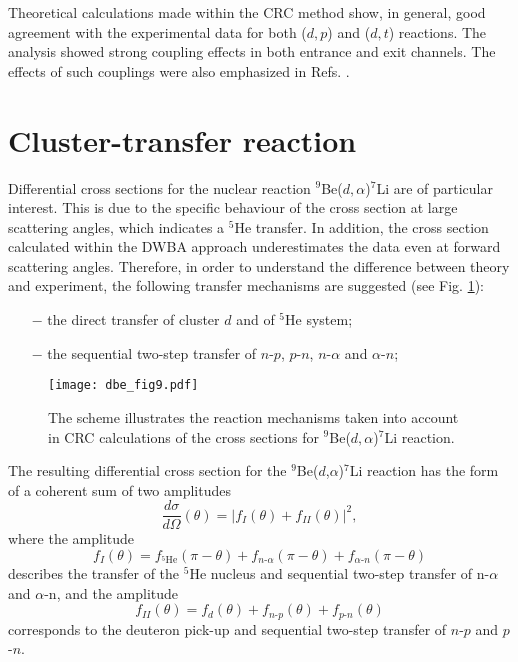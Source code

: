 \documentclass[
12pt, %
oneside, %
english, %
doublespacing, %
doublespacing, %
toctotoc, %
parskip, %
headsepline, %
]{MastersDoctoralThesis} %
\begin{document}
Theoretical calculations made within the CRC method show, in general, good agreement with the experimental data for both ($d,p$)  and ($d,t$) reactions.
The analysis showed strong coupling effects in both entrance and exit channels. The effects of such couplings were also emphasized in Refs. \cite{harakeh1980strong, rudchik2016}.

\section{Cluster-transfer reaction}
Differential cross sections for the nuclear reaction ${^9}$Be($d,\alpha$)${}^7$Li are of particular interest. This is due to the specific behaviour of the cross section at large scattering angles, which indicates a ${}^5$He  transfer. In addition, the cross section calculated within the DWBA approach underestimates the data even at forward scattering angles. Therefore, in order to understand the difference between theory and experiment, the following transfer mechanisms are suggested (see Fig. \ref{dbe_fig9}):
\begin{itemize}
\item[$-$] the direct transfer of cluster $d$ and of ${}^5$He system;
\item[$-$] the sequential two-step transfer of $n$-$p$, $p$-$n$, $n$-$\alpha$ and $\alpha$-$n$;
\end{itemize}


\begin{figure}[tp]
\centering
\texttt{[image: dbe\_fig9.pdf]}
\decoRule
\caption{\label{dbe_fig9}  The scheme illustrates the reaction mechanisms taken into account in CRC calculations of the cross sections for ${}^9$Be($d,\alpha$)${}^7$Li reaction.}
\end{figure}


The resulting differential cross section for the ${^9}$Be($d$,$\alpha$)${}^7$Li reaction has the form of a coherent sum of two amplitudes
\begin{equation}
\frac{d\sigma}{d\Omega}(\theta) =\vert f_{I}(\theta) + f_{II}(\theta) \vert ^2,
\end{equation}
where the amplitude
\begin{equation} \label{eq:ampl1}
f_{I}(\theta)=f_{{}^5\textrm{He}}(\pi - \theta) + f_{n\textrm{-}\alpha}(\pi - \theta) + f_{\alpha\textrm{-}n}(\pi - \theta)
\end{equation}
describes the transfer of the  ${}^5$He nucleus and sequential two-step transfer of n-$\alpha$ and $\alpha$-n, and the amplitude
\begin{equation} \label{eq:ampl2}
f_{II}(\theta)=f_{d}(\theta) + f_{n\textrm{-}p}( \theta) + f_{p\textrm{-}n}(\theta)
\end{equation}
corresponds to the deuteron pick-up and sequential two-step transfer of $n$-$p$ and $p$-$n$.
\end{document}
